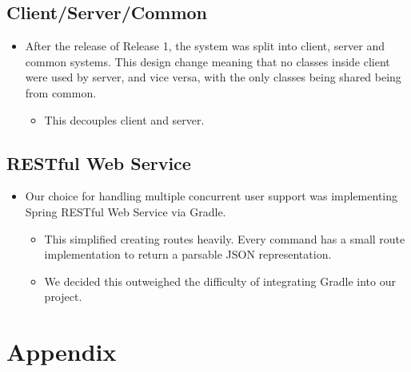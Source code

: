 \documentclass[12pt]{report}
\begin{document}
    \subsection*{Client/Server/Common}\label{subsec:client/server/common}
    \begin{itemize}
        \item After the release of Release 1, the system was split into client, server and common systems.
        This design change meaning that no classes inside client were used by server, and vice versa, with the only classes being shared being from common.
        \begin{itemize}
            \item This decouples client and server.
        \end{itemize}
    \end{itemize}

    \subsection*{RESTful Web Service}\label{subsec:restfulWebService}
    \begin{itemize}
        \item Our choice for handling multiple concurrent user support was implementing Spring RESTful Web Service via Gradle.
        \begin{itemize}
            \item This simplified creating routes heavily.
            Every command has a small route implementation to return a parsable JSON representation.
            \item We decided this outweighed the difficulty of integrating Gradle into our project.
        \end{itemize}
    \end{itemize}

    \newpage
    \section*{Appendix}\label{sec:appendix}
    
\end{document}
